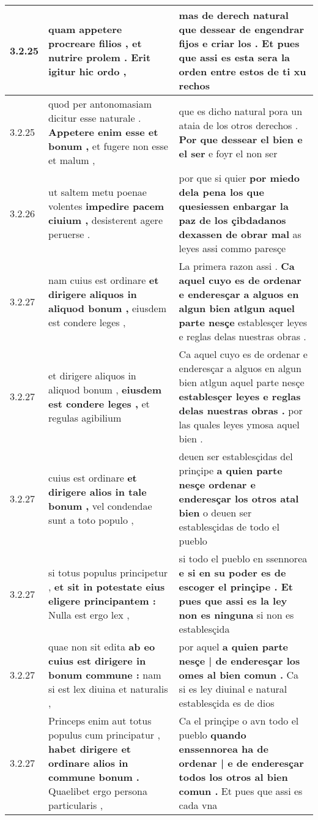 \begin{tabular}{|p{1cm}|p{6.5cm}|p{6.5cm}|}
3.2.25 & quam appetere procreare filios , \textbf{ et nutrire prolem . } Erit igitur hic ordo , & mas de derech natural \textbf{ que dessear de engendrar fijos e criar los . } Et pues que assi es esta sera la orden entre estos de ti xu rechos \\\hline
3.2.25 & quod per antonomasiam dicitur esse naturale . \textbf{ Appetere enim esse et bonum , } et fugere non esse et malum , & que es dicho natural pora un ataia de los otros derechos . \textbf{ Por que dessear el bien e el ser } e foyr el non ser \\\hline
3.2.26 & ut saltem metu poenae volentes \textbf{ impedire pacem ciuium , } desisterent agere peruerse . & por que si quier \textbf{ por miedo dela pena los que quesiessen enbargar la paz de los çibdadanos dexassen de obrar mal } as leyes assi commo paresçe \\\hline
3.2.27 & nam cuius est ordinare \textbf{ et dirigere aliquos in aliquod bonum , } eiusdem est condere leges , & La primera razon assi . \textbf{ Ca aquel cuyo es de ordenar e enderesçar a alguos en algun bien atlgun aquel parte nesçe } establesçer leyes e reglas delas nuestras obras . \\\hline
3.2.27 & et dirigere aliquos in aliquod bonum , \textbf{ eiusdem est condere leges , } et regulas agibilium & Ca aquel cuyo es de ordenar e enderesçar a alguos en algun bien atlgun aquel parte nesçe \textbf{ establesçer leyes e reglas delas nuestras obras . } por las quales leyes ymosa aquel bien . \\\hline
3.2.27 & cuius est ordinare \textbf{ et dirigere alios in tale bonum , } vel condendae sunt a toto populo , & deuen ser establesçidas del prinçipe \textbf{ a quien parte nesçe ordenar e enderesçar los otros atal bien } o deuen ser establesçidas de todo el pueblo \\\hline
3.2.27 & si totus populus principetur , \textbf{ et sit in potestate eius eligere principantem : } Nulla est ergo lex , & si todo el pueblo en ssennorea \textbf{ e si en su poder es de escoger el prinçipe . Et pues que assi es la ley non es ninguna } si non es establesçida \\\hline
3.2.27 & quae non sit edita \textbf{ ab eo cuius est dirigere in bonum commune : } nam si est lex diuina et naturalis , & por aquel \textbf{ a quien parte nesçe | de enderesçar los omes al bien comun . } Ca si es ley diuinal e natural establesçida es de dios \\\hline
3.2.27 & Princeps enim aut totus populus cum principatur , \textbf{ habet dirigere et ordinare alios in commune bonum . } Quaelibet ergo persona particularis , & Ca el prinçipe o avn todo el pueblo \textbf{ quando enssennorea ha de ordenar | e de enderesçar todos los otros al bien comun . } Et pues que assi es cada vna \\\hline

\end{tabular}
